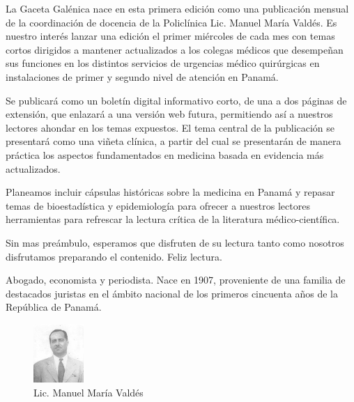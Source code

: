 \documentclass[a4paper]{article}
\date{\today}
\begin{document}
\maketitle

\begin{multicols}{3}



La Gaceta Galénica nace en esta primera edición como una publicación mensual de la coordinación de docencia de la Policlínica Lic. Manuel María Valdés. Es nuestro interés lanzar una edición el primer miércoles de cada mes con temas cortos dirigidos a mantener actualizados a los colegas médicos que desempeñan sus funciones en los distintos servicios de urgencias médico quirúrgicas en instalaciones de primer y segundo nivel de atención en Panamá.

Se publicará como un boletín digital informativo corto, de una a dos páginas de extensión, que enlazará a una versión web futura, permitiendo así a nuestros lectores ahondar en los temas expuestos. El tema central de la publicación se presentará como una viñeta clínica, a partir del cual se presentarán de manera práctica los aspectos fundamentados en medicina basada en evidencia más actualizados.

Planeamos incluir cápsulas históricas sobre la medicina en Panamá y repasar temas de bioestadística y epidemiología para ofrecer a nuestros lectores herramientas para refrescar la lectura crítica de la literatura médico-científica.

Sin mas preámbulo, esperamos que disfruten de su lectura tanto como nosotros disfrutamos preparando el contenido. Feliz lectura.

\closearticle



Abogado, economista y periodista. Nace en 1907, proveniente de una familia de destacados juristas en el ámbito nacional de los primeros cincuenta años de la República de Panamá.

\begin{figure}
	\begin{center}
		\vspace{-25pt}
		\includegraphics[width=0.17\textwidth]{mmvaldes.jpg}
	\end{center}
	\caption*{Lic. Manuel María Valdés}
\end{figure}


\end{multicols}
\end{document}
